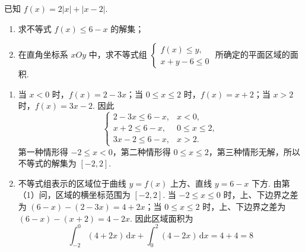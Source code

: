 \begin{problem}
已知 \(f(x)=2|x|+|x-2|\).
\begin{enumerate}
\item 求不等式 \(f(x)\le6-x\) 的解集；
\item 在直角坐标系 \(xOy\) 中，求不等式组 \(\begin{cases}
f(x)\le y,\\
x+y-6\le0
\end{cases}\) 所确定的平面区域的面积.
\end{enumerate}

\begin{solution}
\begin{enumerate}
\item 当 \(x<0\) 时，\(f(x)=2-3x\)；当 \(0\le x\le2\) 时，\(f(x)=x+2\)；当 \(x>2\) 时，\(f(x)=3x-2\). 因此
\[
\begin{cases}
2-3x\le6-x,&x<0,\\
x+2\le6-x,&0\le x\le2,\\
3x-2\le6-x,&x>2.
\end{cases}
\]
第一种情形得 \(-2\le x<0\)，第二种情形得 \(0\le x\le2\)，第三种情形无解，所以不等式的解集为 \([-2,2]\).
\item 不等式组表示的区域位于曲线 \(y=f(x)\) 上方、直线 \(y=6-x\) 下方. 由第（1）问，区域的横坐标范围为 \([-2,2]\). 当 \(-2\le x\le0\) 时，上、下边界之差为 \((6-x)-(2-3x)=4+2x\)；当 \(0\le x\le2\) 时，上、下边界之差为 \((6-x)-(x+2)=4-2x\). 因此区域面积为
\[
\int_{-2}^{0}(4+2x)\,\mathrm{d}x+\int_{0}^{2}(4-2x)\,\mathrm{d}x=4+4=8
\]
\end{enumerate}
\end{solution}
\end{problem}
